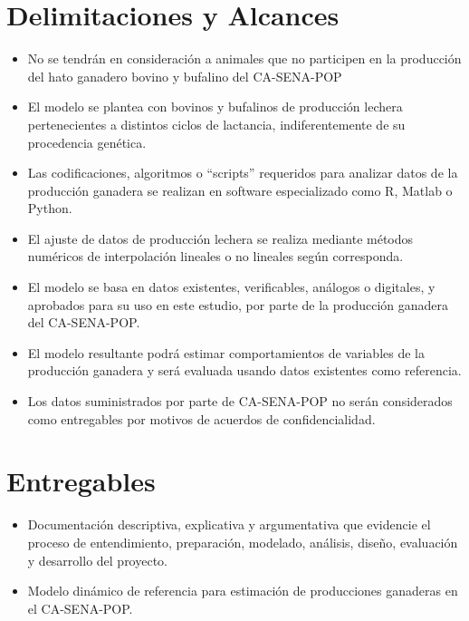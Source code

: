 \section{Delimitaciones y Alcances} \label{limites}
\begin{itemize}
	\item No se tendrán en consideración a animales que no participen en la producción del hato ganadero bovino y bufalino del CA-SENA-POP
	\item El modelo se plantea con bovinos y bufalinos de producción lechera pertenecientes a distintos ciclos de lactancia, indiferentemente de su procedencia genética.
    \item Las codificaciones, algoritmos o ``scripts'' requeridos para analizar datos de la producción ganadera se realizan en software especializado como R, Matlab o Python.
	\item El ajuste de datos de producción lechera se realiza mediante métodos numéricos de interpolación lineales o no lineales según corresponda.
	\item El modelo se basa en datos existentes, verificables, análogos o digitales, y aprobados para su uso en este estudio, por parte de la producción ganadera del CA-SENA-POP.
	\item El modelo resultante podrá estimar comportamientos de variables de la producción ganadera y será evaluada usando datos existentes como referencia.
	\item Los datos suministrados por parte de CA-SENA-POP no serán considerados como entregables por motivos de acuerdos de confidencialidad.
\end{itemize}
\section{Entregables}

\begin{itemize}
	\item Documentación descriptiva, explicativa y argumentativa que evidencie el proceso de entendimiento, preparación, modelado, análisis, diseño, evaluación y desarrollo del proyecto.
	\item Modelo dinámico de referencia para estimación de producciones ganaderas en el CA-SENA-POP.
\end{itemize}
